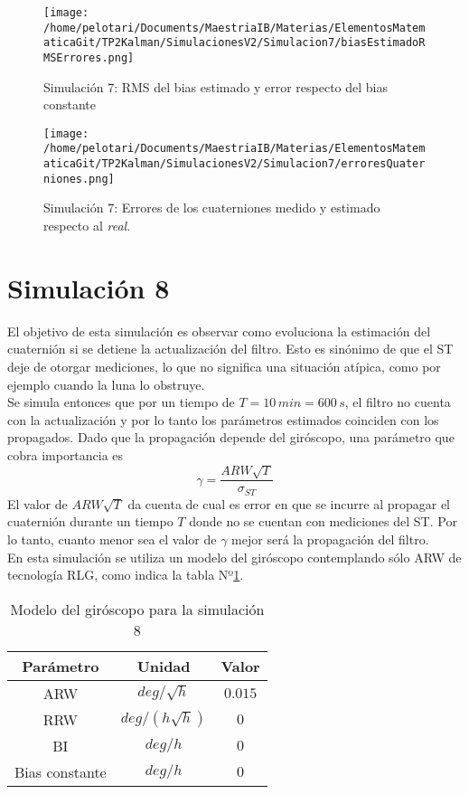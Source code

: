 \documentclass[a4paper,11pt,twoside]{IT-CNEA}
\begin{document}
\begin{figure}[h!]
\centering
\texttt{[image: /home/pelotari/Documents/MaestriaIB/Materias/ElementosMatematicaGit/TP2Kalman/SimulacionesV2/Simulacion7/biasEstimadoRMSErrores.png]}
\caption{Simulación 7:  RMS del bias estimado y error respecto del bias constante}
\label{fig:Simulacion7/biasEstimadoRMSErrores}
\end{figure}
\begin{figure}[h!]
\centering
\texttt{[image: /home/pelotari/Documents/MaestriaIB/Materias/ElementosMatematicaGit/TP2Kalman/SimulacionesV2/Simulacion7/erroresQuaterniones.png]}
\caption{Simulación 7:  Errores de los cuaterniones medido y estimado respecto al \textit{real}.}
\label{fig:Simulacion7/erroresQuaterniones}
\end{figure}
\section{Simulación 8}
El objetivo de esta simulación es observar como evoluciona la estimación del cuaternión si se detiene la actualización del filtro. Esto es sinónimo de que el ST deje de otorgar mediciones, lo que no significa una situación atípica, como por ejemplo cuando la luna lo obstruye. 
\\ Se simula entonces que por un tiempo de $T=10\,min=600\,s$, el filtro no cuenta con la actualización y por lo tanto los parámetros estimados coinciden con los propagados. Dado que la propagación depende del giróscopo, una parámetro que cobra importancia es
\begin{equation}
\gamma =\frac{ARW\sqrt{T}}{\sigma_{ST}}
\end{equation}
El valor de $ARW\sqrt{T}$ da cuenta de cual es error en que se incurre al propagar el cuaternión durante un tiempo $T$ donde no se cuentan con mediciones del ST. Por lo tanto, cuanto menor sea el valor de $\gamma$  mejor será la propagación del filtro. 
\\ En esta simulación se utiliza un modelo del giróscopo contemplando sólo ARW de tecnología RLG, como indica la tabla Nº\ref{tabla:modeloGyroRLGSimulacion8}. 
\begin{table}[h!]
\centering
\caption{Modelo del giróscopo para la simulación 8}
\label{tabla:modeloGyroRLGSimulacion8}
\begin{tabular}{|c|c|c|}
\hline
Parámetro & Unidad& Valor\\ \hline
ARW&$deg/\sqrt{h}$&$0.015$ \\ \hline
RRW&$deg/\left(h\sqrt{h}\right)$&$0$ \\ \hline
BI&$deg/h$&$0$ \\ \hline
Bias constante&$deg/h$&$0$ \\ \hline
\end{tabular}
\end{table}
\end{document}
